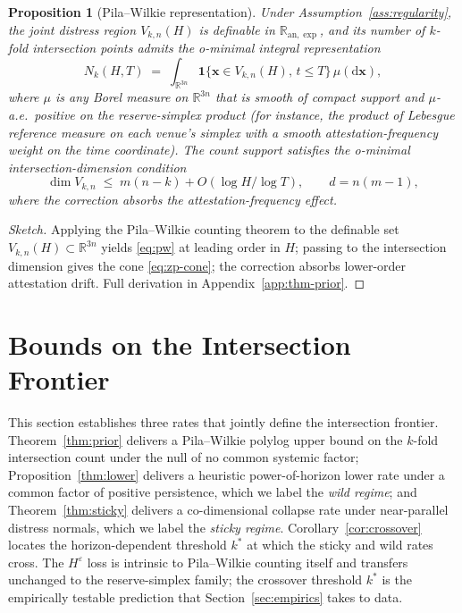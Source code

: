 \documentclass[12pt]{article}
\theoremstyle{sampledef}
\theoremstyle{sampleplain}
\newtheorem{proposition}[definition]{Proposition}
\theoremstyle{sampleremark}
\newcommand{\R}{\mathbb{R}}
\newcommand{\1}{\mathbf{1}}
\begin{document}
\begin{proposition}[Pila--Wilkie representation]\label{prop:pw}
Under Assumption~\ref{ass:regularity}, the joint distress region
$V_{k,n}(H)$ is definable in $\R_{\mathrm{an},\exp}$, and its
number of $k$-fold intersection points admits the o-minimal
integral representation
\begin{equation}\label{eq:pw}
N_k(H,T) \;=\;
\int_{\R^{3n}} \1\{\boldsymbol{x} \in V_{k,n}(H),\, t \le T\}\,
\mu(\mathrm{d}\boldsymbol{x}),
\end{equation}
where $\mu$ is any Borel measure on $\R^{3n}$ that is smooth of
compact support and $\mu$-a.e.\ positive on the reserve-simplex
product (for instance, the product of Lebesgue reference measure on
each venue's simplex with a smooth attestation-frequency weight on
the time coordinate). The count support satisfies the o-minimal
intersection-dimension condition
\begin{equation}\label{eq:zp-cone}
\dim V_{k,n} \;\le\; m(n-k) + O(\log H / \log T),
\qquad d = n(m-1),
\end{equation}
where the correction absorbs the attestation-frequency effect.
\end{proposition}

\begin{proof}[Sketch]
Applying the Pila--Wilkie counting theorem \citep{PilaWilkie2006}
to the definable set $V_{k,n}(H) \subset \R^{3n}$ yields
\eqref{eq:pw} at leading order in $H$; passing to the intersection
dimension gives the cone \eqref{eq:zp-cone}; the correction absorbs
lower-order attestation drift. Full derivation in
Appendix~\ref{app:thm-prior}.
\end{proof}

\section{Bounds on the Intersection Frontier}
\label{sec:bounds}

This section establishes three rates that jointly define the
intersection frontier. Theorem~\ref{thm:prior} delivers a
Pila--Wilkie polylog upper bound on the $k$-fold intersection
count under the null of no common systemic factor;
Proposition~\ref{thm:lower} delivers a heuristic power-of-horizon
lower rate under a common factor of positive persistence, which we
label the \emph{wild regime}; and Theorem~\ref{thm:sticky}
delivers a co-dimensional collapse rate under near-parallel
distress normals, which we label the \emph{sticky regime}.
Corollary~\ref{cor:crossover} locates the horizon-dependent
threshold $k^\ast$ at which the sticky and wild rates cross. The
$H^\varepsilon$ loss is intrinsic to Pila--Wilkie counting itself
and transfers unchanged to the reserve-simplex family; the
crossover threshold $k^\ast$ is the empirically testable prediction
that Section~\ref{sec:empirics} takes to data.
\end{document}
